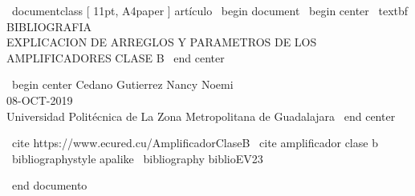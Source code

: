 \ documentclass [ 11pt, A4paper ]{ artículo }
\ begin { document }
\ begin { center }
\ textbf { BIBLIOGRAFIA } \\
EXPLICACION DE ARREGLOS Y PARAMETROS DE LOS AMPLIFICADORES CLASE B
\ end { center }

\ begin { center }
Cedano Gutierrez Nancy Noemi \\
08-OCT-2019 \\
Universidad Politécnica de La Zona Metropolitana de Guadalajara
\ end { center }

\ cite { https://www.ecured.cu/AmplificadorClaseB }
\ cite { amplificador clase b }
\ bibliographystyle {apalike}
\ bibliography {biblioEV23}


\ end { documento }
